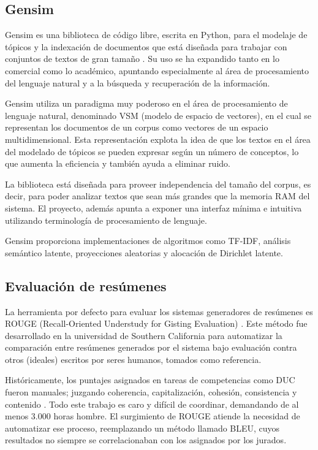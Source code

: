 \documentclass[a4paper]{article}
\begin{document}
\subsection{Gensim}
Gensim es una biblioteca de código libre, escrita en Python, para el modelaje de tópicos y la indexación de documentos que está diseñada para trabajar con conjuntos de textos de gran tamaño \cite{rehurek_lrec}. Su uso se ha expandido tanto en lo comercial como lo académico, apuntando especialmente al área de procesamiento del lenguaje natural y a la búsqueda y recuperación de la información.

Gensim utiliza un paradigma muy poderoso en el área de procesamiento de lenguaje natural, denominado VSM (modelo de espacio de vectores), en el cual se representan los documentos de un corpus como vectores de un espacio multidimensional. Esta representación explota la idea de que los textos en el área del modelado de tópicos se pueden expresar según un número de conceptos, lo que aumenta la eficiencia y también ayuda a eliminar ruido.

La biblioteca está diseñada para proveer independencia del tamaño del corpus, es decir, para poder analizar textos que sean más grandes que la memoria RAM del sistema. El proyecto, además apunta a exponer una interfaz mínima e intuitiva utilizando terminología de procesamiento de lenguaje.

Gensim proporciona implementaciones de algoritmos como TF-IDF, análisis semántico latente, proyecciones aleatorias y alocación de Dirichlet latente.


\subsection{Evaluación de resúmenes}
La herramienta por defecto para evaluar los sistemas generadores de resúmenes es \mbox{ROUGE} (Recall-Oriented Understudy for Gisting Evaluation) \cite{Lin2004a}. Este método fue desarrollado en la universidad de Southern California para automatizar la comparación entre resúmenes generados por el sistema bajo evaluación contra otros (ideales) escritos por seres humanos, tomados como referencia.

Históricamente, los puntajes asignados en tareas de competencias como DUC fueron manuales; juzgando coherencia, capitalización, cohesión, consistencia y contenido \cite{duc2002}. Todo este trabajo es caro y difícil de coordinar, demandando de al menos 3.000 horas hombre. El surgimiento de ROUGE atiende la necesidad de automatizar ese proceso, reemplazando un método llamado BLEU, cuyos resultados no siempre se correlacionaban con los asignados por los jurados.
\end{document}

